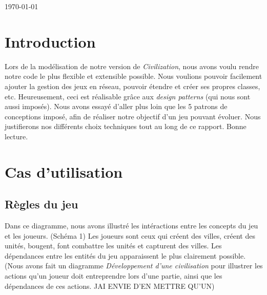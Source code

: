 \begin{titlepage}

{\large \today}\\[3cm] %


 

\vfill %

\end{titlepage}


\section{Introduction}

	Lors de la modélisation de notre version de \textit{Civilization}, nous avons voulu rendre notre code le plus flexible et extensible possible.
Nous voulions pouvoir facilement ajouter la gestion des jeux en réseau, pouvoir étendre et créer ses propres classes, etc.
Heureusement, ceci est réalisable grâce aux \textit{design patterns} (qui nous sont aussi imposés).
Nous avons essayé d'aller plus loin que les 5 patrons de conceptions imposé, afin de réaliser notre objectif d'un jeu pouvant évoluer. Nous justifierons nos différents choix techniques tout au long de ce rapport.
Bonne lecture.

\section{Cas d'utilisation}
	\subsection{Règles du jeu}
		Dans ce diagramme, nous avons illustré les intéractions entre les concepts du jeu et les joueurs. (Schéma 1)
	Les joueurs sont ceux qui créent des villes, créent des unités, bougent, font combattre les unités et capturent des villes.
	Les dépendances entre les entités du jeu apparaissent le plus clairement possible.
	(Nous avons fait un diagramme \textit{Développement d'une civilisation} pour illustrer les actions qu'un joueur doit entreprendre lors d'une partie,
	ainsi que les dépendances de ces actions. JAI ENVIE D'EN METTRE QU'UN)
	
